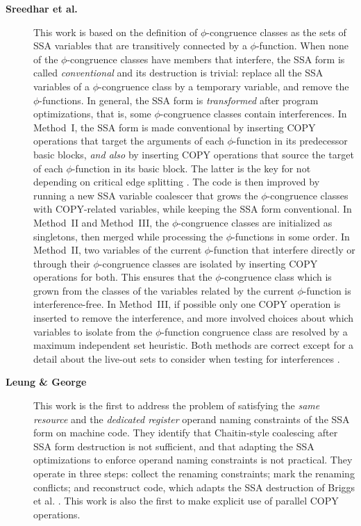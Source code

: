 \begin{description}
\item[\textbf{Sreedhar et al. \cite{Sreedhar:1999:SAS}}] This work is based
on the definition of $\phi$-congruence classes as the sets of SSA variables that are transitively
connected by a $\phi$-function. When none of the $\phi$-congruence classes have
members that interfere, the SSA form is called \emph{conventional} and its
destruction is trivial: replace all the SSA variables of a $\phi$-congruence
class by a temporary variable, and remove the $\phi$-functions. In general, the
SSA form is \emph{transformed} after program optimizations, that is, some
$\phi$-congruence classes contain interferences.  In Method~I, the SSA form is
made conventional by inserting COPY operations that target the arguments of each
$\phi$-function in its predecessor basic blocks, \emph{and also} by inserting
COPY operations that source the target of each $\phi$-function in its basic
block. The latter is the key for not depending on critical edge splitting
\cite{Boissinot:2009:CGO}. The code is then improved by running a new SSA
variable coalescer that grows the $\phi$-congruence classes with COPY-related
variables, while keeping the SSA form conventional. In Method~II and Method~III, the
$\phi$-congruence classes are initialized as singletons, then merged while
processing the $\phi$-functions in some order. In Method~II, two variables of
the current $\phi$-function that interfere directly or through their
$\phi$-congruence classes are isolated by inserting COPY operations for both.
This ensures that the $\phi$-congruence class which is grown from the classes of
the variables related by the current $\phi$-function is interference-free. In
Method~III, if possible only one COPY operation is inserted to remove the
interference, and more involved choices about which variables to isolate from
the $\phi$-function congruence class are resolved by a maximum independent set
heuristic.  Both methods are correct except for a detail about the live-out sets
to consider when testing for interferences \cite{Boissinot:2009:CGO}.

\item[\textbf{Leung \& George \cite{Leung:1999:PLDI}}] This work is the first to address the
problem of satisfying the \emph{same resource} and the \emph{dedicated register} operand
naming constraints of the SSA form on machine code. They identify that
Chaitin-style coalescing after SSA form destruction is not sufficient, and that
adapting the SSA optimizations to enforce operand naming constraints is not
practical.  They operate in three steps: collect the renaming constraints; mark
the renaming conflicts; and reconstruct code, which adapts the SSA destruction
of Briggs et al. \cite{Briggs:1998:SPE}. This work is also the first to make
explicit use of parallel COPY operations.


\end{description}
